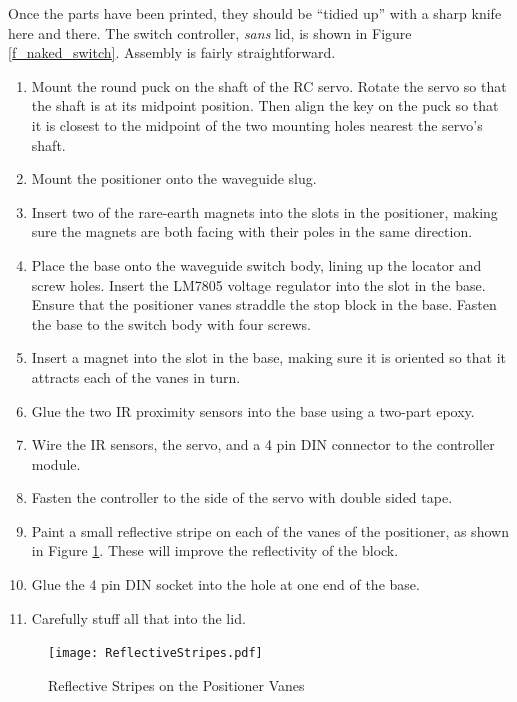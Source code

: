 \documentclass[12pt]{article}
\begin{document}
Once the parts have been printed, they should be ``tidied up'' with
a sharp knife here and there.  
The switch controller, {\em sans} lid, is shown in Figure \ref{f_naked_switch}.
Assembly is fairly straightforward.

\begin{enumerate}
\setlength\itemsep{0em}  
\item Mount the round puck on the shaft of the RC servo. Rotate the
  servo so that the shaft is at its midpoint position. Then align
  the key on the puck so that it is closest to the midpoint of the
  two mounting holes nearest the servo's shaft.
\item Mount the positioner onto the waveguide slug.
\item Insert two of the rare-earth magnets into the slots in
  the positioner, making sure the magnets are both facing with
  their poles in the same direction.
\item Place the base onto the waveguide switch body, lining up
  the locator and screw holes. Insert the LM7805 voltage regulator
  into the slot in the base. Ensure that the positioner vanes
  straddle the stop block in the base. Fasten the base to the
  switch body with four screws.
\item Insert a magnet into the slot in the base, making sure
  it is oriented so that it attracts each of the vanes in turn.
\item Glue the two IR proximity sensors into the base using
  a two-part epoxy.
\item Wire the IR sensors, the servo, and a 4 pin DIN connector
  to the controller module.
\item Fasten the controller to the side of the servo with
  double sided tape.
\item Paint a small reflective stripe on each of the vanes of the
  positioner, as shown in Figure \ref{f_positioner_stripe}.
  These will improve the reflectivity of the block. 
\item Glue the 4 pin DIN socket into the hole at one end
  of the base.
  \item Carefully stuff all that into the lid. 
  \end{enumerate}


\begin{figure}[tb]
  \centering
  \texttt{[image: ReflectiveStripes.pdf]}
  \caption{\label{f_positioner_stripe}Reflective Stripes on the Positioner Vanes}
\end{figure}
\end{document}
